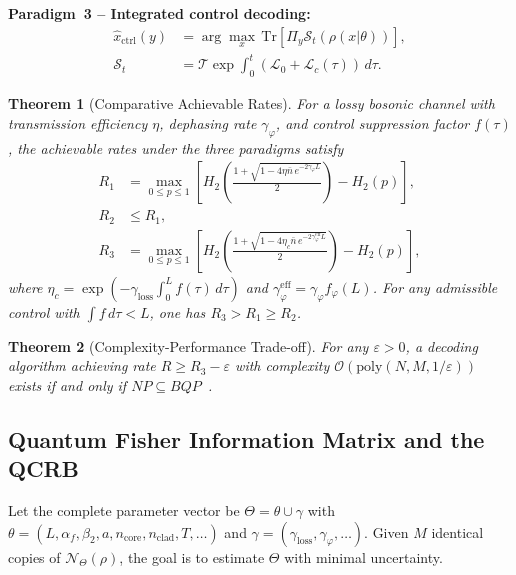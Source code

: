 \documentclass[journal,twocolumn]{IEEEtran}
\theoremstyle{definition}
\theoremstyle{plain}
\newtheorem{theorem}{Theorem}[section]
\newcommand{\Tr}{\mathrm{Tr}}
\newcommand{\alphaf}{\alpha_{f}}
\begin{document}
\medskip\noindent\textbf{Paradigm~3 -- Integrated control decoding:}
\begin{align}
  \hat x_{\mathrm{ctrl}}(y) &= \arg\max_x\,
    \Tr[\Pi_y \mathcal{S}_t(\rho(x|\theta))], \nonumber\\
  \mathcal{S}_t &= \mathcal{T}\!\exp\!\int_0^t
    (\mathcal{L}_0 + \mathcal{L}_c(\tau))\,d\tau.
  \label{eq:paradigm3}
\end{align}

\begin{theorem}[Comparative Achievable Rates]
\label{thm:comparative}
For a lossy bosonic channel with transmission efficiency $\eta$,
dephasing rate $\gamma_\varphi$, and control suppression factor
$f(\tau)$, the achievable rates under the three paradigms satisfy
\begin{align}
  R_1 &= \max_{0 \le p \le 1}\!\left[
    H_2\!\left(\frac{1+\sqrt{1 - 4\eta\bar n\,
      e^{-2\gamma_\varphi L}}}{2}\right) - H_2(p)\right],
    \nonumber\\
  R_2 &\le R_1, \nonumber\\
  R_3 &= \max_{0\le p\le1}\!\left[
    H_2\!\left(\frac{1+\sqrt{1 - 4\eta_c\bar n\,
      e^{-2\gamma_\varphi^{\mathrm{eff}}L}}}{2}\right)
    - H_2(p)\right],
  \label{eq:rates}
\end{align}
where $\eta_c = \exp(-\gamma_{\mathrm{loss}}\int_0^L f(\tau)\,d\tau)$
and $\gamma_\varphi^{\mathrm{eff}} = \gamma_\varphi f_\varphi(L)$.
For any admissible control with $\int f\, d\tau < L$, one has
$R_3 > R_1 \ge R_2$.
\end{theorem}

\begin{theorem}[Complexity-Performance Trade-off]
\label{thm:complexity}
For any $\varepsilon > 0$, a decoding algorithm achieving rate
$R \ge R_3 - \varepsilon$ with complexity
$\mathcal{O}(\mathrm{poly}(N, M, 1/\varepsilon))$ exists if and
only if $NP \subseteq BQP$~\cite{aaronson2005}.
\end{theorem}

\subsection{Quantum Fisher Information Matrix and the QCRB}

Let the complete parameter vector be $\Theta = \theta \cup \gamma$
with $\theta = (L,\alphaf,\beta_2,a,n_{\mathrm{core}},
n_{\mathrm{clad}},T,\ldots)$ and $\gamma = (\gamma_{\mathrm{loss}},
\gamma_\varphi, \ldots)$.  Given $M$ identical copies of
$\mathcal{N}_\Theta(\rho)$, the goal is to estimate $\Theta$ with
minimal uncertainty.
\end{document}
